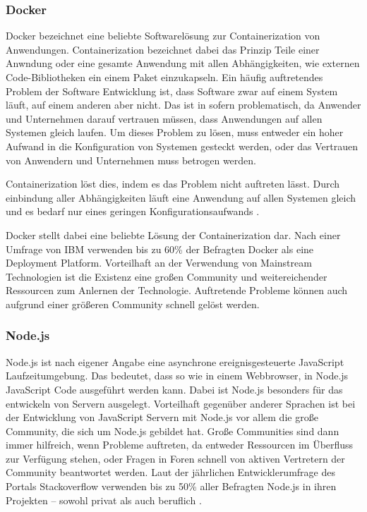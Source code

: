 \subsubsection*{Docker}
Docker bezeichnet eine beliebte Softwarelösung zur Containerization von Anwendungen.
Containerization bezeichnet dabei das Prinzip Teile einer Anwndung oder eine gesamte Anwendung mit allen Abhängigkeiten, wie externen Code-Bibliotheken ein einem Paket einzukapseln.
Ein häufig auftretendes Problem der Software Entwicklung ist, dass Software zwar auf einem System läuft, auf einem anderen aber nicht.
Das ist in sofern problematisch, da Anwender und Unternehmen darauf vertrauen müssen, dass Anwendungen auf allen Systemen gleich laufen.
Um dieses Problem zu lösen, muss entweder ein hoher Aufwand in die Konfiguration von Systemen gesteckt werden, oder das Vertrauen von Anwendern und Unternehmen muss betrogen werden.

Containerization löst dies, indem es das Problem nicht auftreten lässt.
Durch einbindung aller Abhängigkeiten läuft eine Anwendung auf allen Systemen gleich und es bedarf nur eines geringen Konfigurationsaufwands \autocite{B_IBMCloudEducation.2019}.

Docker stellt dabei eine beliebte Lösung der Containerization dar.
Nach einer Umfrage von IBM verwenden bis zu 60\% der Befragten Docker als eine Deployment Platform. \autocite{B_IBMCloud.}
Vorteilhaft an der Verwendung von Mainstream Technologien ist die Existenz eine großen Community und weitereichender Ressourcen zum Anlernen der Technologie.
Auftretende Probleme können auch aufgrund einer größeren Community schnell gelöst werden. 

\subsubsection*{Node.js}
Node.js ist nach eigener Angabe eine asynchrone ereignisgesteuerte JavaScript Laufzeitumgebung. \autocite{Node.js.}
Das bedeutet, dass so wie in einem Webbrowser, in Node.js JavaScript Code ausgeführt werden kann.
Dabei ist Node.js besonders für das entwickeln von Servern ausgelegt.
Vorteilhaft gegenüber anderer Sprachen ist bei der Entwicklung von JavaScript Servern mit Node.js vor allem die große Community, die sich um Node.js gebildet hat.
Große Communities sind dann immer hilfreich, wenn Probleme auftreten, da entweder Ressourcen im Überfluss zur Verfügung stehen, oder Fragen in Foren schnell von aktiven Vertretern der Community beantwortet werden.
Laut der jährlichen Entwicklerumfrage des Portals Stackoverflow verwenden bis zu 50\% aller Befragten Node.js in ihren Projekten -- sowohl privat als auch beruflich \autocite{B_Stackoverflow.2020}.

